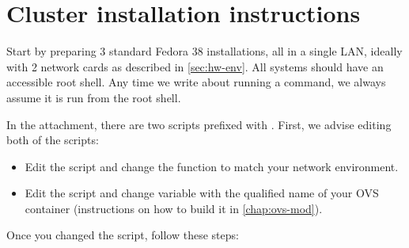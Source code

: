 \chapter{Cluster installation instructions}
\label{chap:install}

Start by preparing 3 standard Fedora 38 installations, all in a single LAN, ideally with 2 network cards as described in \cref{sec:hw-env}. All systems should have an accessible root shell. Any time we write about running a command, we always assume it is run from the root shell.

In the attachment, there are two scripts prefixed with . First, we advise editing both of the scripts:

\begin{itemize}
    \item Edit the  script and change the  function to match your network environment.

    \item Edit the  script and change  variable with the qualified name of your OVS container (instructions on how to build it in \cref{chap:ovs-mod}).
\end{itemize}

Once you changed the script, follow these steps:

